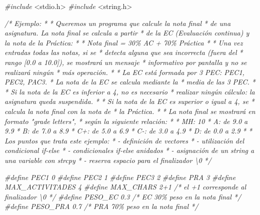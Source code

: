 \documentclass[
]{book}
\newenvironment{Shaded}{\begin{snugshade}}{\end{snugshade}}
\newcommand{\CommentTok}[1]{\textcolor[rgb]{0.56,0.35,0.01}{\textit{#1}}}
\newcommand{\ImportTok}[1]{#1}
\newcommand{\PreprocessorTok}[1]{\textcolor[rgb]{0.56,0.35,0.01}{\textit{#1}}}
\begin{document}
\begin{Shaded}
\begin{Highlighting}[]
\PreprocessorTok{\#include }\ImportTok{\textless{}stdio.h\textgreater{}}
\PreprocessorTok{\#include }\ImportTok{\textless{}string.h\textgreater{}}

\CommentTok{/* Ejemplo:}
\CommentTok{ *}
\CommentTok{ * Queremos un programa que calcule la nota final}
\CommentTok{ * de una asignatura. La nota final se calcula a partir}
\CommentTok{ * de la EC (Evaluación continua) y la nota de la Práctica:}
\CommentTok{ *}
\CommentTok{ * Nota final = 30\% AC + 70\% Práctica}
\CommentTok{ *}
\CommentTok{ * Una vez entradas todas las notas, si se}
\CommentTok{ * detecta alguna que sea incorrecta (fuera del}
\CommentTok{ * rango [0.0 a 10.0]), se mostrará un mensaje}
\CommentTok{ * informativo por pantalla y no se realizará ningún}
\CommentTok{ * más operación.}
\CommentTok{ *}
\CommentTok{ * La EC está formada por 3 PEC: PEC1, PEC2, PAC3.}
\CommentTok{ * La nota de la EC se calcula mediante la}
\CommentTok{ * media de las 3 PEC.}
\CommentTok{ *}
\CommentTok{ * Si la nota de la EC es inferior a 4, no es necesario}
\CommentTok{ * realizar ningún cálculo: la asignatura queda suspendida.}
\CommentTok{ *}
\CommentTok{ * Si la nota de la EC es superior o igual a 4, se}
\CommentTok{ * calcula la nota final con la nota de}
\CommentTok{ * la Práctica.}
\CommentTok{ *}
\CommentTok{ * La nota final se mostrará en formato "grade letters",}
\CommentTok{ * según la siguiente relación:}
\CommentTok{ *}
\CommentTok{ * MH: 10}
\CommentTok{ * A: de 9.0 a 9.9}
\CommentTok{ * B: de 7.0 a 8.9}
\CommentTok{ * C+: de 5.0 a 6.9}
\CommentTok{ * C{-}: de 3.0 a 4.9}
\CommentTok{ * D: de 0.0 a 2.9}
\CommentTok{ *}
\CommentTok{ * Los puntos que trata este ejemplo:}
\CommentTok{ * {-} definición de vectores}
\CommentTok{ * {-} utilización del condicional if{-}else}
\CommentTok{ * {-} condicionales if{-}else anidados}
\CommentTok{ * {-} asignación de un string a una variable con strcpy}
\CommentTok{ * {-} reserva espacio para el finalizador \textquotesingle{}\textbackslash{}0\textquotesingle{}}
\CommentTok{ */}

\PreprocessorTok{\#define PEC1 0}
\PreprocessorTok{\#define PEC2 1}
\PreprocessorTok{\#define PEC3 2}
\PreprocessorTok{\#define PRA 3}
\PreprocessorTok{\#define MAX\_ACTIVITADES 4}
\PreprocessorTok{\#define MAX\_CHARS 2+1     /* el +1 corresponde al finalizador \textquotesingle{}\textbackslash{}0\textquotesingle{} */}
\PreprocessorTok{\#define PESO\_EC 0.3       }\CommentTok{/* EC 30\% peso en la nota final */}
\PreprocessorTok{\#define PESO\_PRA 0.7      }\CommentTok{/* PRA 70\% peso en la nota final */}


\end{Highlighting}
\end{Shaded}
\end{document}
